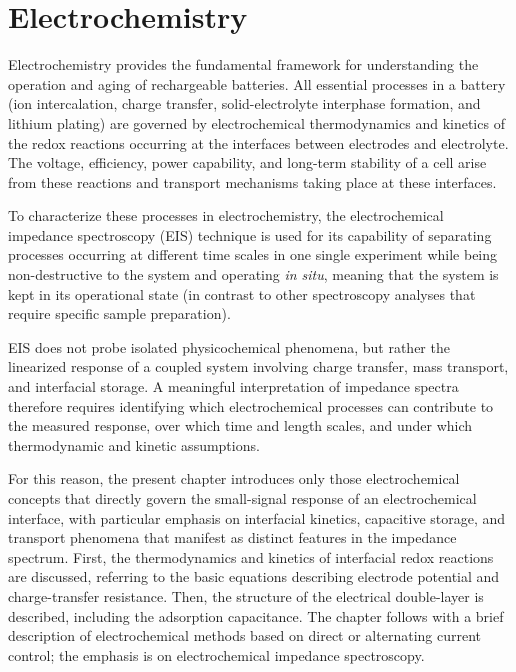 \chapter{Electrochemistry}
\label{ch:electrochemistry}

Electrochemistry provides the fundamental framework for understanding the operation and aging of rechargeable batteries. 
All essential processes in a battery (ion intercalation, charge transfer, solid-electrolyte interphase formation, and lithium plating) are governed by electrochemical thermodynamics and kinetics of the redox reactions occurring at the interfaces between electrodes and electrolyte. 
The voltage, efficiency, power capability, and long-term stability of a cell arise from these reactions and transport mechanisms taking place at these interfaces.

To characterize these processes in electrochemistry, the electrochemical impedance spectroscopy (EIS) technique is used for its capability of separating processes occurring at different time scales in one single experiment while being non-destructive to the system and operating \emph{in situ}, meaning that the system is kept in its operational state (in contrast to other spectroscopy analyses that require specific sample preparation). 

EIS does not probe isolated physicochemical phenomena, but rather the linearized response of a coupled system involving charge transfer, mass transport, and interfacial storage.
A meaningful interpretation of impedance spectra therefore requires identifying which electrochemical processes can contribute to the measured response, over which time and length scales, and under which thermodynamic and kinetic assumptions.

For this reason, the present chapter introduces only those electrochemical concepts that directly govern the small-signal response of an electrochemical interface, with particular emphasis on interfacial kinetics, capacitive storage, and transport phenomena that manifest as distinct features in the impedance spectrum. 
First, the thermodynamics and kinetics of interfacial redox reactions are discussed, referring to the basic equations describing electrode potential and charge-transfer resistance.
Then, the structure of the electrical double-layer is described, including the adsorption capacitance.
The chapter follows with a brief description of electrochemical methods based on direct or alternating current control; the emphasis is on electrochemical impedance spectroscopy.

